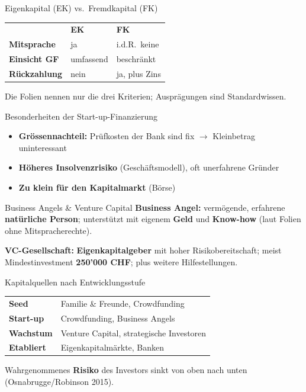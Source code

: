 \documentclass[a4paper, fontsize=7pt]{scrartcl}
\renewcommand*{\arraystretch}{1.5}  %
\begin{document}
\begin{mainbox}{Eigenkapital (EK) vs.\ Fremdkapital (FK)}
\renewcommand*{\arraystretch}{1.2}
\begin{tabularx}{\linewidth}{@{}lXX@{}}
 & \textbf{EK} & \textbf{FK} \\
\textbf{Mitsprache} & ja & i.d.R.\ keine \\
\textbf{Einsicht GF} & umfassend & beschränkt \\
\textbf{Rückzahlung} & nein & ja, plus Zins \\
\end{tabularx}
Die Folien nennen nur die drei Kriterien; Ausprägungen sind Standardwissen.
\end{mainbox}

\begin{mainbox}{Besonderheiten der Start-up-Finanzierung}
\begin{itemize}
    \item \textbf{Grössennachteil:} Prüfkosten der Bank sind fix $\to$
    Kleinbetrag uninteressant
    \item \textbf{Höheres Insolvenzrisiko} (Geschäftsmodell), oft
    unerfahrene Gründer
    \item \textbf{Zu klein für den Kapitalmarkt} (Börse)
\end{itemize}
\end{mainbox}

\begin{mainbox}{Business Angels \& Venture Capital}
\textbf{Business Angel:} vermögende, erfahrene \textbf{natürliche Person};
unterstützt mit eigenem \textbf{Geld} und \textbf{Know-how} (laut Folien ohne
Mitspracherechte).

\textbf{VC-Gesellschaft:} \textbf{Eigenkapitalgeber} mit hoher
Risikobereitschaft; meist Mindestinvestment \textbf{250'000 CHF}; plus weitere
Hilfestellungen.
\end{mainbox}

\begin{mainbox}{Kapitalquellen nach Entwicklungsstufe}
\renewcommand*{\arraystretch}{1.2}
\begin{tabularx}{\linewidth}{@{}lX@{}}
\textbf{Seed} & Familie \& Freunde, Crowdfunding \\
\textbf{Start-up} & Crowdfunding, Business Angels \\
\textbf{Wachstum} & Venture Capital, strategische Investoren \\
\textbf{Etabliert} & Eigenkapitalmärkte, Banken \\
\end{tabularx}
Wahrgenommenes \textbf{Risiko} des Investors sinkt von oben nach unten
(Osnabrugge/Robinson 2015).
\end{mainbox}
\end{document}
